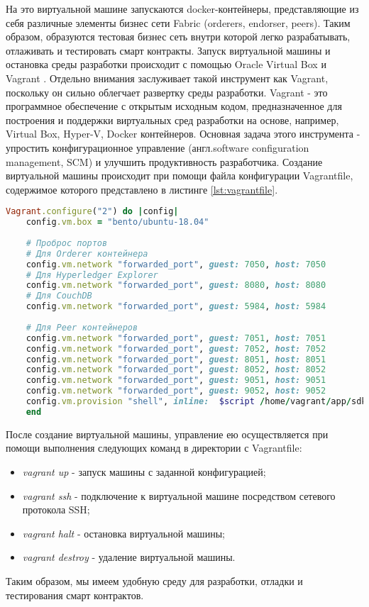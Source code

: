 На это виртуальной машине запускаются docker-контейнеры, представляющие из себя различные элементы бизнес сети Fabric (orderers, endorser, peers). Таким образом, образуются тестовая бизнес сеть внутри которой легко разрабатывать, отлаживать и тестировать смарт контракты. Запуск виртуальной машины и остановка среды разработки происходит с помощью Oracle Virtual Box \cite{oracle-vbox-site} и Vagrant \cite{vagrant-site}.
Отдельно внимания заслуживает такой инструмент как Vagrant, поскольку он сильно облегчает развертку среды разработки. 
Vagrant - это программное обеспечение с открытым исходным кодом, предназначенное для построения и поддержки виртуальных сред разработки на основе, например, Virtual Box, Hyper-V, Docker контейнеров. Основная задача этого инструмента - упростить конфигурационное управление (англ.software configuration management, SCM) \cite{scm} и улучшить продуктивность разработчика. 
Создание виртуальной машины происходит при помощи файла конфигурации Vagrantfile, содержимое которого представлено в листинге \ref{lst:vagrantfile}.

\begin{lstlisting}[caption={Конфигурация виртуальной машины: Vagrantfile},label={lst:vagrantfile},language=Ruby]
	Vagrant.configure("2") do |config|
	config.vm.box = "bento/ubuntu-18.04"
	
	# Проброс портов
	# Для Orderer контейнера
	config.vm.network "forwarded_port", guest: 7050, host: 7050
	# Для Hyperledger Explorer
	config.vm.network "forwarded_port", guest: 8080, host: 8080
	# Для CouchDB
	config.vm.network "forwarded_port", guest: 5984, host: 5984
	
	# Для Peer контейнеров
	config.vm.network "forwarded_port", guest: 7051, host: 7051
	config.vm.network "forwarded_port", guest: 7052, host: 7052
	config.vm.network "forwarded_port", guest: 8051, host: 8051
	config.vm.network "forwarded_port", guest: 8052, host: 8052
	config.vm.network "forwarded_port", guest: 9051, host: 9051
	config.vm.network "forwarded_port", guest: 9052, host: 9052
	config.vm.provision "shell", inline:  $script /home/vagrant/app/sdk/vagrant_node_modules
	end
\end{lstlisting}


После создание виртуальной машины, управление ею осуществляется при помощи выполнения следующих команд в директории с Vagrantfile:
\begin{itemize}
	\item \textit{vagrant up} - запуск машины с заданной конфигурацией;
	\item \textit{vagrant ssh} - подключение к виртуальной машине посредством сетевого протокола SSH;
	\item \textit{vagrant halt} - остановка виртуальной машины;
	\item \textit{vagrant destroy} - удаление виртуальной машины.
\end{itemize}
Таким образом, мы имеем удобную среду для разработки, отладки и тестирования смарт контрактов.

